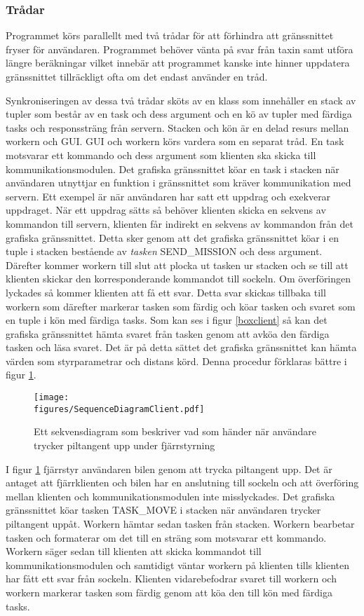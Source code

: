 \documentclass[tekniskrapport/tech.tex]{subfiles}
\begin{document}
\subsubsection{Trådar}
Programmet körs parallellt med två trådar för att förhindra att gränssnittet
fryser för användaren. Programmet behöver vänta på svar från taxin samt utföra
längre beräkningar vilket innebär att programmet kanske inte hinner uppdatera
gränssnittet tillräckligt ofta om det endast använder en tråd.

Synkroniseringen av dessa två trådar sköts av en klass som innehåller en stack
av tupler som består av en task och dess argument och en kö av tupler med
färdiga tasks och responssträng från servern. Stacken och kön är en delad
resurs mellan workern och GUI. GUI och workern körs vardera som en separat
tråd. En task motsvarar ett kommando och dess argument som klienten ska skicka
till kommunikationsmodulen. Det grafiska gränssnittet köar en task i stacken
när användaren utnyttjar en funktion i gränssnittet som kräver kommunikation
med servern. Ett exempel är när användaren har satt ett uppdrag och exekverar
uppdraget. När ett uppdrag sätts så behöver klienten skicka en sekvens av
kommandon till servern, klienten får indirekt en sekvens av kommandon från det
grafiska gränssnittet. Detta sker genom att det grafiska gränssnittet köar i en
tuple i stacken bestående av \emph{tasken} SEND\_MISSION och dess argument.
Därefter kommer workern till slut att plocka ut tasken ur stacken och se till
att klienten skickar den korresponderande kommandot till sockeln. Om
överföringen lyckades så kommer klienten att få ett svar. Detta svar skickas
tillbaka till workern som därefter markerar tasken som färdig och köar tasken
och svaret som en tuple i kön med färdiga tasks. Som kan ses i figur
\ref{boxclient} så kan det grafiska gränssnittet hämta svaret från tasken genom
att avköa den färdiga tasken och läsa svaret. Det är på detta sättet det
grafiska gränssnittet kan hämta värden som styrparametrar och distans körd.
Denna procedur förklaras bättre i figur \ref{sequenceremote}.

\begin{figure}[h]
\centering
\texttt{[image: \\figures/SequenceDiagramClient.pdf]}
	\caption{Ett sekvensdiagram som beskriver vad som händer när användare trycker
    piltangent upp under fjärrstyrning}
	\label{sequenceremote}
\end{figure}

I figur \ref{sequenceremote} fjärrstyr användaren bilen genom att trycka
piltangent upp. Det är antaget att fjärrklienten och bilen har en anslutning
till sockeln och att överföring mellan klienten och kommunikationsmodulen inte
misslyckades. Det grafiska gränssnittet köar tasken TASK\_MOVE i stacken när
användaren trycker piltangent uppåt. Workern hämtar sedan tasken från stacken.
Workern bearbetar tasken och formaterar om det till en sträng som motsvarar ett
kommando. Workern säger sedan till klienten att skicka kommandot till
kommunikationsmodulen och samtidigt väntar workern på klienten tills klienten
har fått ett svar från sockeln. Klienten vidarebefodrar svaret till workern och
workern markerar tasken som färdig genom att köa den till kön med färdiga
tasks.
\end{document}

